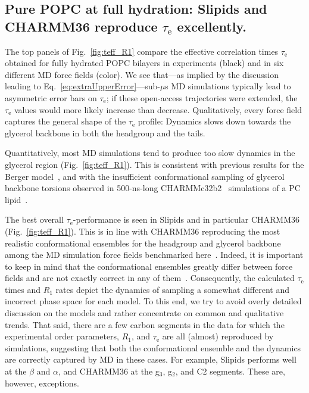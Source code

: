 \documentclass[journal=jcisd8,manuscript=article,layout=twocolumn]{achemso}
\begin{document}
\subsection*{Pure POPC at full hydration: Slipids and CHARMM36 reproduce $\tau_\mathrm e$ excellently.}
The top panels of Fig.~\ref{fig:teff_R1} compare the effective correlation times $\tau_\mathrm{e}$ obtained for fully hydrated POPC bilayers in experiments (black) and in six different MD force fields (color).
We see that---as implied by the discussion leading to Eq.~\eqref{eq:extraUpperError}---sub-$\mu$s MD simulations typically lead to asymmetric error bars on $\tau_\mathrm{e}$;
if these open-access trajectories were extended,
the $\tau_\mathrm{e}$ values would more likely increase than decrease.
Qualitatively, every force field captures the general shape of the $\tau_\mathrm{e}$ profile: Dynamics slows down towards the glycerol backbone in both the headgroup and the tails.

Quantitatively, most MD simulations tend to produce too slow dynamics in the glycerol region (Fig.~\ref{fig:teff_R1}).
This %
is consistent with previous results for the Berger model~\cite{ferreira15}, and with the
insufficient conformational sampling of glycerol backbone torsions observed in 500-ns-long CHARMM\-c32b2~\cite{schlenkrich96,feller00} simulations of a PC lipid~\cite{vogel12}. %

The best overall $\tau_\mathrm{e}$-performance is seen in
Slipids and in particular CHARMM36 (Fig.~\ref{fig:teff_R1}). %
%
This is in line with CHARMM36 reproducing the most realistic conformational ensembles
for the headgroup and glycerol backbone among the MD simulation force fields benchmarked here~\cite{botan15,Antila:2019a}.
%
Indeed, it is important to keep in mind that the conformational ensembles %
greatly differ between  force fields and are not exactly correct in any of them~\cite{botan15,Antila:2019a}.
Consequently, the calculated $\tau_\mathrm{e}$ times and $R_1$ rates
depict the dynamics of sampling a somewhat different and incorrect phase space
for each model. %
To this end, we try to avoid overly detailed discussion on the models and rather concentrate on common and qualitative trends.
That said,
there are a few carbon segments in the data for which
the experimental order parameters, $R_1$, and $\tau_\mathrm{e}$ are all (almost) reproduced by simulations,
suggesting that both the conformational ensemble and the dynamics are correctly captured by MD in these cases. 
For example, 
Slipids performs well at the $\beta$ and $\alpha$, and
CHARMM36 at the g$_3$, g$_2$,  and C2 segments. %
These are, however, exceptions.
\end{document}
